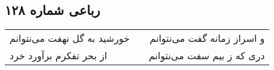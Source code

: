 \begin{center}
\section*{رباعی شماره ۱۲۸}
\label{sec:sh128}
\begin{longtable}{l p{0.5cm} r}
خورشید به گل نهفت می‌نتوانم
&&
و اسراز زمانه گفت می‌نتوانم
\\
از بحر تفکرم برآورد خرد
&&
دری که ز بیم سفت می‌نتوانم
\\
\end{longtable}
\end{center}
